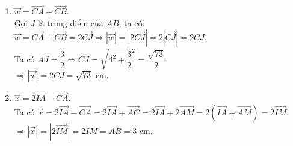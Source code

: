 \begin{bt}
{\begin{enumerate}
		\end{enumerate}
			\begin{enumerate}		
			\item[b)] $\overrightarrow{w}=\overrightarrow{CA}+\overrightarrow{CB}$. \\
			Gọi $J$ là trung điểm của $AB$, ta có:\\
			$\overrightarrow{w}=\overrightarrow{CA}+\overrightarrow{CB}=2\overrightarrow{CJ}\Rightarrow \left|\overrightarrow{w}\right|=\left|2\overrightarrow{CJ}\right|=2\left|\overrightarrow{CJ}\right|=2CJ$.\\ 
			Ta có $AJ=\dfrac{3}{2}\Rightarrow CJ=\sqrt{4^2+{\dfrac{3}{2}}^2}=\dfrac{\sqrt{73}}{2}$.\\
			$\Rightarrow \left|\overrightarrow{w}\right|=2CJ=\sqrt{73}$ cm.
			\item[c)] $\overrightarrow{x}=2\overrightarrow{IA}-\overrightarrow{CA}$.\\
			Ta có $\overrightarrow{x}=2\overrightarrow{IA}-\overrightarrow{CA}=2\overrightarrow{IA}+\overrightarrow{AC}=2\overrightarrow{IA}+2\overrightarrow{AM}=2\left(\overrightarrow{IA}+\overrightarrow{AM} \right)=2\overrightarrow{IM}$.\\
			$\Rightarrow \left|\overrightarrow{x}\right|=\left|2\overrightarrow{IM}\right|=2IM=AB=3$ cm.
		\end{enumerate}
	}
\end{bt}


